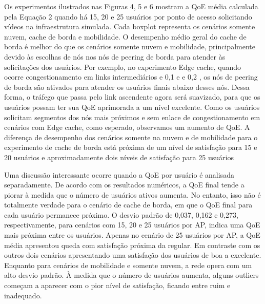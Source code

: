 
Os experimentos ilustrados nas Figuras 4, 5 e 6 mostram a QoE média calculada pela Equação 2 quando há 15, 20 e 25 usuários por ponto de acesso solicitando vídeos na infraestrutura simulada. Cada boxplot representa os cenários somente nuvem, cache de borda e mobilidade. O desempenho médio geral do cache de borda é melhor do que os cenários somente nuvem e mobilidade, principalmente devido às escolhas de nós nos nós de peering de borda para atender às solicitações dos usuários. Por exemplo, no experimento Edge cache, quando ocorre congestionamento em links intermediários e 0,1 e e 0,2 , os nós de peering de borda são ativados para atender os usuários finais abaixo desses nós. Dessa forma, o tráfego que passa pelo link ascendente agora será suavizado, para que os usuários possam ter sua QoE aprimorada a um nível excelente. Como os usuários solicitam segmentos dos nós mais próximos e sem enlace de congestionamento em cenários com Edge cache, como esperado, observamos um aumento de QoE. A diferença de desempenho dos cenários somente na nuvem e de mobilidade para o experimento de cache de borda está próxima de um nível de satisfação para 15 e 20 usuários e aproximadamente dois níveis de satisfação para 25 usuários

Uma discussão interessante ocorre quando a QoE por usuário é analisada separadamente. De acordo com os resultados numéricos, a QoE final tende a piorar à medida que o número de usuários ativos aumenta. No entanto, isso não é totalmente verdade para o cenário de cache de borda, em que o QoE final para cada usuário permanece próximo. O desvio padrão de 0,037, 0,162 e 0,273, respectivamente, para cenários com 15, 20 e 25 usuários por AP, indica uma QoE mais próxima entre os usuários. Apenas no cenário de 25 usuários por AP, a QoE média apresentou queda com satisfação próxima da regular. Em contraste com os outros dois cenários apresentando uma satisfação dos usuários de boa a excelente. Enquanto para cenários de mobilidade e somente nuvem, a rede opera com um alto desvio padrão. À medida que o número de usuários aumenta, alguns outliers começam a aparecer com o pior nível de satisfação, ficando entre ruim e inadequado.

